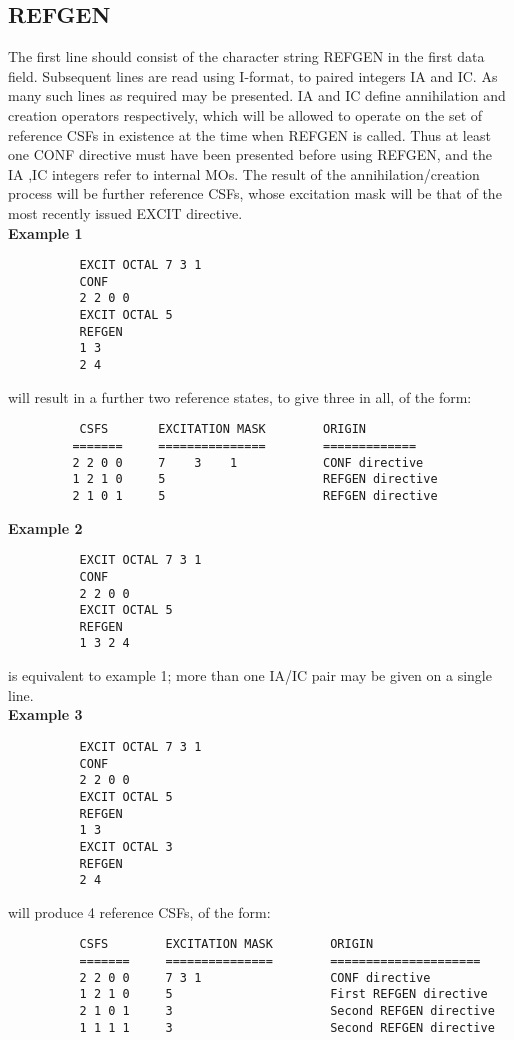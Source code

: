\documentclass[11pt,fleqn]{article}
\begin{document}
\subsection[REFGEN]{REFGEN }

 The first line should consist of the character string REFGEN in the first
data field. Subsequent lines are read using I-format, to paired integers
IA and IC. As many such lines as required may be presented.
IA and IC define annihilation and creation operators respectively,
which will be allowed to operate on the set of reference CSFs 
in existence
at the time when REFGEN is called. Thus at least one CONF directive must
have been presented before using REFGEN, and the IA ,IC integers refer to
internal MOs. The result of the annihilation/creation process will be
further reference CSFs, whose excitation mask will be that of the 
most recently issued EXCIT directive.\\

{\bf  Example 1}
{
\footnotesize
\begin{verbatim}
          EXCIT OCTAL 7 3 1
          CONF
          2 2 0 0
          EXCIT OCTAL 5
          REFGEN
          1 3
          2 4
\end{verbatim}
}

will result in a further two reference states, to give three in all,
of the form:
{
\footnotesize
\begin{verbatim}
          CSFS       EXCITATION MASK        ORIGIN 
         =======     ===============        =============
         2 2 0 0     7    3    1            CONF directive
         1 2 1 0     5                      REFGEN directive
         2 1 0 1     5                      REFGEN directive
\end{verbatim}
}


{\bf Example 2}
{
\footnotesize
\begin{verbatim}
          EXCIT OCTAL 7 3 1
          CONF
          2 2 0 0
          EXCIT OCTAL 5
          REFGEN
          1 3 2 4
\end{verbatim}
}

is equivalent to example 1; more than one IA/IC pair may be given on
a single line.\\



{\bf Example 3}
{
\footnotesize
\begin{verbatim}
          EXCIT OCTAL 7 3 1
          CONF
          2 2 0 0
          EXCIT OCTAL 5
          REFGEN
          1 3
          EXCIT OCTAL 3
          REFGEN
          2 4
\end{verbatim}
}
will produce 4 reference CSFs, of the form:
{
\footnotesize
\begin{verbatim}
          CSFS        EXCITATION MASK        ORIGIN 
          =======     ===============        =====================
          2 2 0 0     7 3 1                  CONF directive
          1 2 1 0     5                      First REFGEN directive
          2 1 0 1     3                      Second REFGEN directive
          1 1 1 1     3                      Second REFGEN directive
\end{verbatim}
}
\end{document}
